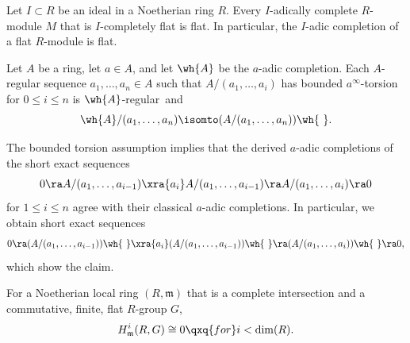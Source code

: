  \label{flat-lemma}
Let $I \subset R$ be an ideal in a Noetherian ring $R$. Every $I$-adically complete $R$-module $M$ that is $I$-completely flat  is flat. In particular, the $I$-adic completion of a flat $R$-module is flat. \QED
\elem




\blem \label{slip-in-complete}
Let $A$ be a ring, let $a \in A$, and let $\wh{A}$ be the $a$-adic completion. Each $A$-regular sequence $a_1, \dotsc, a_n \in A$ such that $A/(a_1, \dotsc, a_i)$ has bounded $a^\infty$-torsion for $0 \le i \le n$ is $\wh{A}$-regular~and
\[
\wh{A}/(a_1, \dotsc, a_n) \isomto (A/(a_1, \dotsc, a_n))\wh{\ }.
\]
\elem

\bpf
The bounded torsion assumption implies that the derived $a$-adic completions of the short exact sequences
\[
0 \ra A/(a_1, \dotsc, a_{i - 1}) \xra{a_i}  A/(a_1, \dotsc, a_{i - 1}) \ra  A/(a_1, \dotsc, a_{i}) \ra 0
\]
for $1 \le i \le n$ agree with their classical $a$-adic completions. In particular, we obtain short exact sequences
\[
0 \ra (A/(a_1, \dotsc, a_{i - 1}))\wh{\ } \xra{a_i}  (A/(a_1, \dotsc, a_{i - 1}))\wh{\ } \ra  (A/(a_1, \dotsc, a_{i}))\wh{\ } \ra 0,
\]
which show the claim.
\epf




\begin{theorem}
\notready \label{main-pf}
For a Noetherian local ring $(R,\mathfrak m)$ that is a complete intersection and a commutative, finite, flat $R$-group $G$,
\[
H^i_{\mathfrak m}(R,G) \cong 0 \qxq{for} i < \dim(R).
\]
\end{theorem}

